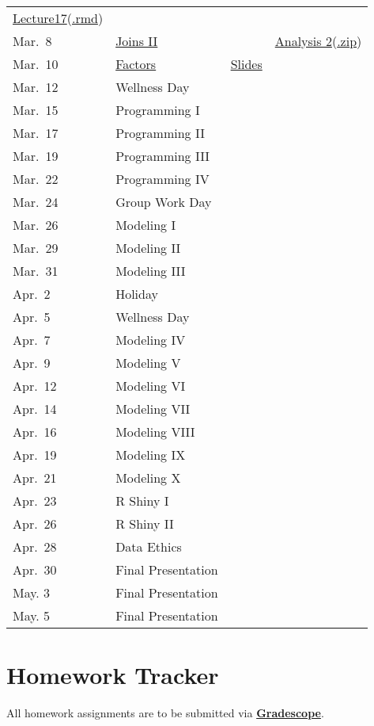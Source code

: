 \documentclass[
]{article}
\begin{document}
\begin{longtable}[]{@{}llrr@{}}
\href{Tutorial/Lecture17.html}{Lecture17}(\href{https://drive.google.com/file/d/1CsQXu0QzF6N9n64aeGVVsKqNGlG3ODj_/view?usp=sharing}{.rmd})\tabularnewline
Mar.~8 &
\href{https://uncch.hosted.panopto.com/Panopto/Pages/Viewer.aspx?id=b34a3653-9791-4f9f-b121-ace500eeba1e}{Joins
II} & & \href{Homework/Analysis\%202/Analysis_2.html}{Analysis
2}(\href{https://drive.google.com/file/d/1lop1deCM_s5r7aaPqoa1uQtZdC3SyMBi/view?usp=sharing}{.zip})\tabularnewline
Mar.~10 &
\href{https://uncch.hosted.panopto.com/Panopto/Pages/Viewer.aspx?id=dbe15939-0086-4079-8b3c-ace700e6c583}{Factors}
& \href{Lecture/Lecture19/Lecture\%2019\%20Factors.pdf}{Slides}
&\tabularnewline
Mar.~12 & Wellness Day & &\tabularnewline
Mar.~15 & Programming I & &\tabularnewline
Mar.~17 & Programming II & &\tabularnewline
Mar.~19 & Programming III & &\tabularnewline
Mar.~22 & Programming IV & &\tabularnewline
Mar.~24 & Group Work Day & &\tabularnewline
Mar.~26 & Modeling I & &\tabularnewline
Mar.~29 & Modeling II & &\tabularnewline
Mar.~31 & Modeling III & &\tabularnewline
Apr.~2 & Holiday & &\tabularnewline
Apr.~5 & Wellness Day & &\tabularnewline
Apr.~7 & Modeling IV & &\tabularnewline
Apr.~9 & Modeling V & &\tabularnewline
Apr.~12 & Modeling VI & &\tabularnewline
Apr.~14 & Modeling VII & &\tabularnewline
Apr.~16 & Modeling VIII & &\tabularnewline
Apr.~19 & Modeling IX & &\tabularnewline
Apr.~21 & Modeling X & &\tabularnewline
Apr.~23 & R Shiny I & &\tabularnewline
Apr.~26 & R Shiny II & &\tabularnewline
Apr.~28 & Data Ethics & &\tabularnewline
Apr.~30 & Final Presentation & &\tabularnewline
May. 3 & Final Presentation & &\tabularnewline
May. 5 & Final Presentation & &\tabularnewline
\bottomrule
\end{longtable}

\hypertarget{homework-tracker}{%
\section{\texorpdfstring{\textbf{Homework
Tracker}}{Homework Tracker}}\label{homework-tracker}}

All homework assignments are to be submitted via
\textbf{\href{https://www.gradescope.com/}{Gradescope}}.
\end{document}
